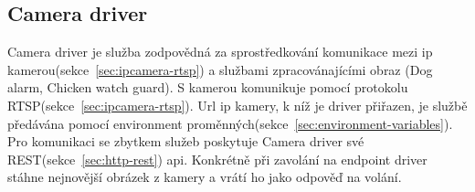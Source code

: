 
\subsection{Camera driver}\label{subsec:camera-driver}
Camera driver je služba zodpovědná za sprostředkování komunikace  mezi ip kamerou(sekce~\ref{sec:ipcamera-rtsp}) a službami zpracovánajícími obraz (Dog alarm, Chicken watch guard).\newline
S kamerou komunikuje pomocí protokolu RTSP(sekce~\ref{sec:ipcamera-rtsp}).
Url ip kamery, k níž je driver přiřazen, je službě předávána pomocí environment proměnných(sekce~\ref{sec:environment-variables}).
Pro komunikaci se zbytkem služeb poskytuje Camera driver své REST(sekce~\ref{sec:http-rest}) api.
Konkrétně při zavolání na endpoint driver stáhne nejnovější obrázek z kamery a vrátí ho jako odpověď na volání.

